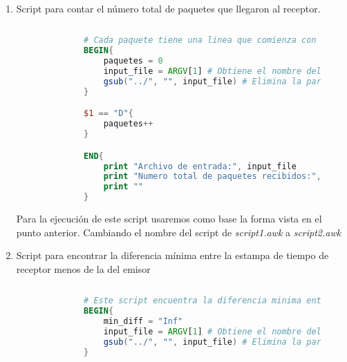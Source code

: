 \begin{enumerate}
\begin{figure}[H]
\begin{lstlisting}[frame=single, breaklines=true, basicstyle=\footnotesize\ttfamily, breakatwhitespace=false, 
      columns=flexible, tabsize=2, showstringspaces=false, language=bash]
      awk -f ./script1.awk ../1.txt > ./output
      awk -f ./script1.awk ../6.txt >> ./output
      
    \end{lstlisting}
  \end{figure}

  \newpage
  \item Script para contar el n\'umero total de paquetes que llegaron al receptor.
  \begin{figure}[H]
    \centering
    \begin{lstlisting}[frame=single, breaklines=true, basicstyle=\footnotesize\ttfamily, breakatwhitespace=false, 
        columns=flexible, tabsize=2, showstringspaces=false, language=AWK] 
  
        # Cada paquete tiene una linea que comienza con "D".
        BEGIN{
            paquetes = 0
            input_file = ARGV[1] # Obtiene el nombre del archivo del parametro de la ejeucion
            gsub("../", "", input_file) # Elimina la parte inicial del parametro para tener nada mas el nombre del archivo  
        }

        $1 == "D"{
            paquetes++
        }

        END{
            print "Archivo de entrada:", input_file
            print "Numero total de paquetes recibidos:", paquetes
            print ""
        }

    \end{lstlisting}
    \label{fig:scriptPaquetesRecibidos}
  \end{figure}

  \noindent Para la ejecuci\'on de este script usaremos como base la forma vista en el punto anterior. 
  Cambiando el nombre del script de \textit{script1.awk} a \textit{script2.awk}

  \item Script para encontrar la diferencia m\'inima entre la estampa de tiempo de receptor menos de la del emisor
  \begin{figure}[H]
    \centering
    \begin{lstlisting}[frame=single, breaklines=true, basicstyle=\footnotesize\ttfamily, breakatwhitespace=false, 
        columns=flexible, tabsize=2, showstringspaces=false, language=AWK] 
  
        # Este script encuentra la diferencia minima entre la estampa del receptor y la del emisor.
        BEGIN{
            min_diff = "Inf"
            input_file = ARGV[1] # Obtiene el nombre del archivo del parametro de la ejeucion
            gsub("../", "", input_file) # Elimina la parte inicial del parametro para tener nada mas el nombre del archivo  
        }


\end{lstlisting}
\end{figure}
\end{enumerate}
